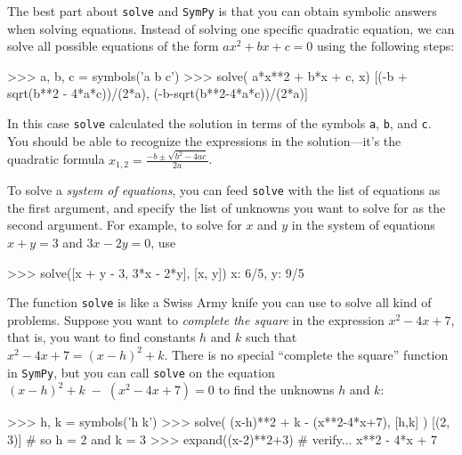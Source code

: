 The best part about \texttt{solve} and \texttt{SymPy} is that you can obtain symbolic answers when solving equations. 
Instead of solving one specific quadratic equation,
we can solve all possible equations of the form $ax^2 + bx+c=0$ using the following steps:

\small
\begin{verbatimtab}
>>> a, b, c = symbols('a b c')
>>> solve( a*x**2 + b*x + c, x)
[(-b + sqrt(b**2 - 4*a*c))/(2*a), (-b-sqrt(b**2-4*a*c))/(2*a)]
\end{verbatimtab}
\normalsize

\noindent
In this case \texttt{solve} calculated the solution in terms of the symbols \texttt{a}, \texttt{b}, and \texttt{c}.
You should be able to recognize the expressions in the solution---it's the quadratic formula $x_{1,2} = \frac{-b \pm \sqrt{b^2 - 4ac}}{2a}$.				



\bigskip

\noindent
To solve a \emph{system of equations},
you can feed \texttt{solve} with the list of equations as the first argument, and specify the list of unknowns you want to solve for as the second argument.
For example, to solve for $x$ and $y$ in the system of equations $x+y=3$ and $3x-2y=0$, use

\small
\begin{verbatimtab}
>>> solve([x + y - 3, 3*x - 2*y], [x, y])
{x: 6/5, y: 9/5}
\end{verbatimtab}
\normalsize

\bigskip

\noindent
The function \texttt{solve} is like a Swiss Army knife you can use to solve all kind of problems.
Suppose you want to \emph{complete the square} in the expression $x^2-4x+7$,								
that is, you want to find constants $h$ and $k$ such that $x^2-4x+7 = (x-h)^2 +k$.
There is no special ``complete the square'' function in \texttt{SymPy},
but you can call \texttt{solve} on the equation $(x-h)^2 +k \; - \;  (x^2-4x+7) = 0$
to find the unknowns $h$ and $k$:

\small
\begin{verbatimtab}
>>> h, k = symbols('h k')
>>> solve( (x-h)**2 + k  - (x**2-4*x+7), [h,k] )
[(2, 3)]                              # so h = 2 and k = 3
>>> expand((x-2)**2+3)                # verify...
x**2 - 4*x + 7
\end{verbatimtab}
\normalsize

